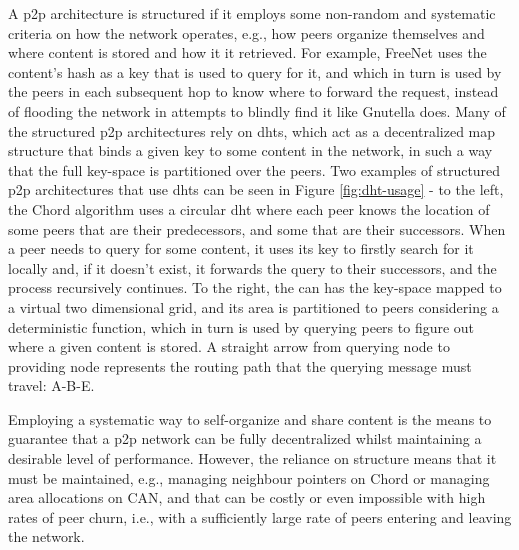     A \gls{p2p} architecture is structured if it employs some non-random and systematic criteria on how the network operates, e.g., how peers organize themselves and where content is stored and how it it retrieved.
    For example, FreeNet \cite{freenet} uses the content's hash as a key that is used to query for it, and which in turn is used by the peers in each subsequent hop to know where to forward the request, instead of flooding the network in attempts to blindly find it like Gnutella does.
    Many of the structured \gls{p2p} architectures rely on \glspl{dht}, which act as a decentralized map structure that binds a given key to some content in the network, in such a way that the full key-space is partitioned over the peers.
    Two examples of structured \gls{p2p} architectures that use \glspl{dht} can be seen in Figure \ref{fig:dht-usage} - to the left, the Chord algorithm uses a circular \gls{dht} where each peer knows the location of some peers that are their predecessors, and some that are their successors.
    When a peer needs to query for some content, it uses its key to firstly search for it locally and, if it doesn't exist, it forwards the query to their successors, and the process recursively continues.
    To the right, the \gls{can} has the key-space mapped to a virtual two dimensional grid, and its area is partitioned to peers considering a deterministic function, which in turn is used by querying peers to figure out where a given content is stored.
    A straight arrow from querying node to providing node represents the routing path that the querying message must travel: A-B-E.

    Employing a systematic way to self-organize and share content is the means to guarantee that a \gls{p2p} network can be fully decentralized whilst maintaining a desirable level of performance.
    However, the reliance on structure means that it must be maintained, e.g., managing neighbour pointers on Chord or managing area allocations on CAN, and that can be costly or even impossible with high rates of peer churn, i.e., with a sufficiently large rate of peers entering and leaving the network.

